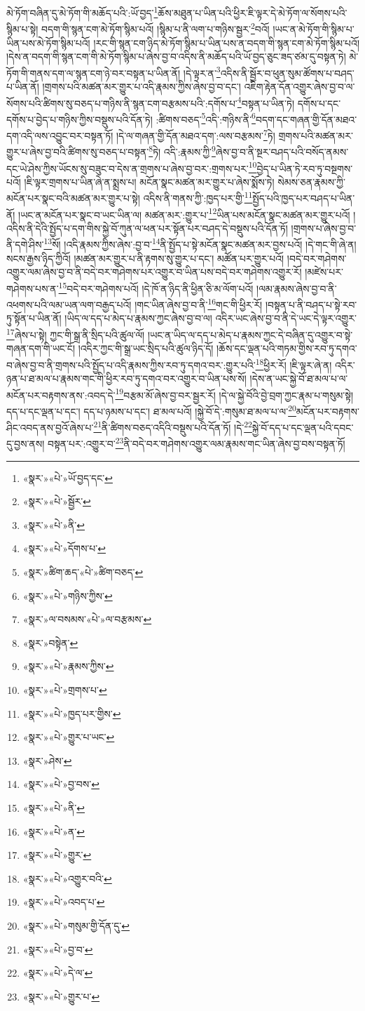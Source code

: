 མེ་ཏོག་བཞིན་དུ་མེ་ཏོག་གི་མཆོད་པའི་:ཡོ་བྱད་\footnote{«སྣར་»«པེ་»ཡོ་བྱད་དང་}ཆོས་མཐུན་པ་ཡིན་པའི་ཕྱིར་ཇི་ལྟར་དེ་མེ་ཏོག་ལ་སོགས་པའི་སྙིམ་པ་སྟེ། བདག་གི་སྙན་ངག་མེ་ཏོག་སྙིམ་པའོ། །སྙིམ་པ་ནི་ལག་པ་གཉིས་སྦྱར་\footnote{«སྣར་»«པེ་»སྦྱོར་}བའོ། །ཡང་ན་མེ་ཏོག་གི་སྙིམ་པ་ཡིན་པས་མེ་ཏོག་སྙིམ་པའོ། །རང་གི་སྙན་ངག་ཉིད་མེ་ཏོག་སྙིམ་པ་ཡིན་པས་ན་བདག་གི་སྙན་ངག་མེ་ཏོག་སྙིམ་པའོ། །དེས་ན་བདག་གི་སྙན་ངག་གི་མེ་ཏོག་སྙིམ་པ་ཞེས་བྱ་བ་འདིས་ནི་མཆོད་པའི་ཡོ་བྱད་ཅུང་ཟད་ཙམ་དུ་བསྟན་ཏེ། མེ་ཏོག་གི་གནས་དག་ལ་སྙན་ངག་ཉེ་བར་བསྟན་པ་ཡིན་ནོ། །དེ་ལྟར་ན་\footnote{«སྣར་»«པེ་»ནི་}འདིས་ནི་སྦྱོར་བ་ཕུན་སུམ་ཚོགས་པ་བཤད་པ་ཡིན་ནོ། །གྲགས་པའི་མཚན་མར་གྱུར་པ་འདི་རྣམས་ཀྱིས་ཞེས་བྱ་བ་དང་། འཇིག་རྟེན་དོན་འགྱུར་ཞེས་བྱ་བ་ལ་སོགས་པའི་ཚིགས་སུ་བཅད་པ་གཉིས་ནི་སྙན་ངག་བརྩམས་པའི་:དགོས་པ་\footnote{«སྣར་»«པེ་»དོགས་པ་}བསྟན་པ་ཡིན་ཏེ། དགོས་པ་དང་དགོས་པ་བྱེད་པ་གཉིས་ཀྱིས་བསྡུས་པའི་དོན་ཏེ། :ཚིགས་བཅད་\footnote{«སྣར་»ཚིག་ཆད་«པེ་»ཚིག་བཅད་}འདི་:གཉིས་ནི་\footnote{«སྣར་»«པེ་»གཉིས་ཀྱིས་}བདག་དང་གཞན་གྱི་དོན་མཐའ་དག་འདི་ལས་འབྱུང་བར་བསྟན་ཏོ། །དེ་ལ་གཞན་གྱི་དོན་མཐའ་དག་:ལས་བརྩམས་\footnote{«སྣར་»ལ་བསམས་«པེ་»ལ་བརྩམས་}ཏེ། གྲགས་པའི་མཚན་མར་གྱུར་པ་ཞེས་བྱ་བའི་ཚིགས་སུ་བཅད་པ་བསྟན་\footnote{«སྣར་»བསྟེན་}ཏེ། འདི་:རྣམས་ཀྱི་\footnote{«སྣར་»«པེ་»རྣམས་ཀྱིས་}ཞེས་བྱ་བ་ནི་སྔར་བཤད་པའི་བསོད་ནམས་དང་ཡེ་ཤེས་ཀྱིས་ཡོངས་སུ་བཟུང་བ་དེས་ན་གྲགས་པ་ཞེས་བྱ་བར་:གྲགས་པར་\footnote{«སྣར་»«པེ་»གྲགས་པ་}བྱེད་པ་ཡིན་ཏེ་རབ་ཏུ་བསྔགས་པའོ། །ཇི་ལྟར་གྲགས་པ་ཡིན་ཞེ་ན་སྨྲས་པ། མངོན་སྣང་མཚན་མར་གྱུར་པ་ཞེས་སྨོས་ཏེ། སེམས་ཅན་རྣམས་ཀྱི་མངོན་པར་སྣང་བའི་མཚན་མར་གྱུར་པ་སྟེ། འདིས་ནི་གནས་ཀྱི་:ཁྱད་པར་གྱི་\footnote{«སྣར་»«པེ་»ཁྱད་པར་གྱིས་}སྤྱོད་པའི་ཁྱད་པར་བཤད་པ་ཡིན་ནོ། །ཡང་ན་མངོན་པར་སྣང་བ་ཡང་ཡིན་ལ། མཚན་མར་:གྱུར་པ་\footnote{«སྣར་»«པེ་»གྱུར་པ་ཡང་}ཡིན་པས་མངོན་སྣང་མཚན་མར་གྱུར་པའོ། །འདིས་ནི་དེའི་སྤྱོད་པ་དག་གིས་སྐྱེ་བོ་ཀུན་ལ་ཕན་པར་སྟོན་པར་བཤད་དེ་བསྡུས་པའི་དོན་ཏོ། །གྲགས་པ་ཞེས་བྱ་བ་ནི་དགེ་ཤིས་\footnote{«སྣར་»ཤེས་}སོ། །འདི་རྣམས་ཀྱིས་ཞེས་:བྱ་བ་\footnote{«སྣར་»«པེ་»བྱ་བས་}ནི་སྤྱོད་པ་སྟེ་མངོན་སྣང་མཚན་མར་བྱས་པའོ། །དེ་གང་གི་ཞེ་ན། སངས་རྒྱས་ཉིད་ཀྱིའོ། །མཚན་མར་གྱུར་པ་ནི་རྟགས་སུ་གྱུར་པ་དང་། མཚོན་པར་གྱུར་པའོ། །བདེ་བར་གཤེགས་འགྱུར་ལམ་ཞེས་བྱ་བ་ནི་བདེ་བར་གཤེགས་པར་འགྱུར་བ་ཡིན་པས་བདེ་བར་གཤེགས་འགྱུར་རོ། །མཛེས་པར་གཤེགས་པས་ན་\footnote{«སྣར་»«པེ་»ནི་}བདེ་བར་གཤེགས་པའོ། །དེ་ཁོ་ན་ཉིད་ནི་ཕྱིན་ཅི་མ་ལོག་པའོ། །ལམ་རྣམས་ཞེས་བྱ་བ་ནི་འཕགས་པའི་ལམ་ཡན་ལག་བརྒྱད་པའོ། །གང་ཡིན་ཞེས་བྱ་བ་ནི་\footnote{«སྣར་»«པེ་»ན་}གང་གི་ཕྱིར་རོ། །བསྟན་པ་ནི་བཤད་པ་སྟེ་རབ་ཏུ་སྟོན་པ་ཡིན་ནོ། །ཡིད་ལ་དད་པ་མེད་པ་རྣམས་ཀྱང་ཞེས་བྱ་བ་ལ། འདིར་ཡང་ཞེས་བྱ་བ་ནི་དེ་ཡང་དེ་ལྟར་འགྱུར་\footnote{«སྣར་»«པེ་»གྱུར་}ཞེས་པ་སྟེ། ཀྱང་གི་སྒྲ་ནི་སྲིད་པའི་ཚུལ་ལོ། །ཡང་ན་ཡིད་ལ་དད་པ་མེད་པ་རྣམས་ཀྱང་དེ་བཞིན་དུ་འགྱུར་བ་སྟེ་གཞན་དག་གི་ཡང་ངོ། །འདིར་ཀྱང་གི་སྒྲ་ཡང་སྲིད་པའི་ཚུལ་ཉིད་དོ། །ཆོས་དང་ལྡན་པའི་གཏམ་གྱིས་རབ་ཏུ་དགའ་བ་ཞེས་བྱ་བ་ནི་གྲགས་པའི་སྤྱོད་པ་འདི་རྣམས་ཀྱིས་རབ་ཏུ་དགའ་བར་:གྱུར་པའི་\footnote{«སྣར་»«པེ་»འགྱུར་བའི་}ཕྱིར་རོ། །ཇི་ལྟར་ཞེ་ན། འདིར་ཉན་པ་ཐ་མལ་པ་རྣམས་གང་གི་ཕྱིར་རབ་ཏུ་དགའ་བར་འགྱུར་བ་ཡིན་པས་སོ། །དེས་ན་ཡང་སྐྱེ་བོ་ཐ་མལ་པ་ལ་མངོན་པར་བརྟགས་ནས་:འབད་དེ་\footnote{«སྣར་»«པེ་»འབད་པ་}བརྩམ་མོ་ཞེས་བྱ་བར་སྦྱར་རོ། །དེ་ལ་སྐྱེ་བོའི་བྱེ་བྲག་ཀྱང་རྣམ་པ་གསུམ་སྟེ། དད་པ་དང་ལྡན་པ་དང་། དད་པ་ཉམས་པ་དང་། ཐ་མལ་པའོ། །སྐྱེ་བོ་དེ་:གསུམ་ཐ་མལ་པ་ལ་\footnote{«སྣར་»«པེ་»གསུམ་གྱི་དོན་དུ་}མངོན་པར་བརྟགས་ཤིང་འབད་ནས་བྱའོ་ཞེས་པ་\footnote{«སྣར་»«པེ་»བྱ་བ་}ནི་ཚིགས་བཅད་འདིའི་བསྡུས་པའི་དོན་ཏོ། །དེ་\footnote{«སྣར་»«པེ་»དེ་ལ་}སྐྱེ་བོ་དད་པ་དང་ལྡན་པའི་དབང་དུ་བྱས་ནས། བསྟན་པར་:འགྱུར་བ་\footnote{«སྣར་»«པེ་»གྱུར་པ་}ནི་བདེ་བར་གཤེགས་འགྱུར་ལམ་རྣམས་གང་ཡིན་ཞེས་བྱ་བས་བསྟན་ཏོ། 